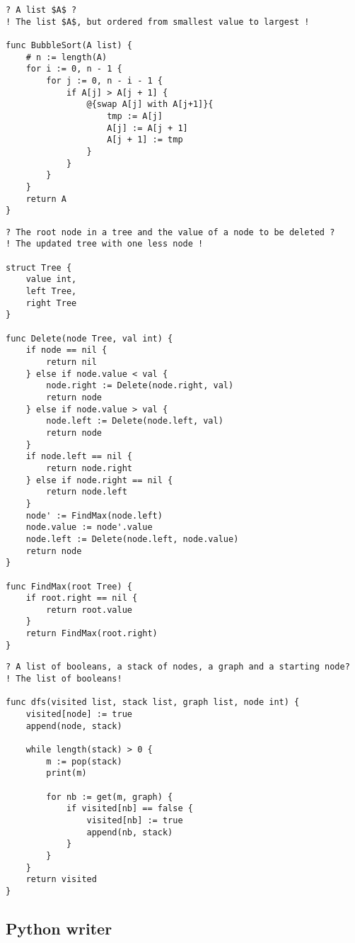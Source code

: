 \begin{lstlisting}[caption={The result of transpiling \Cref{bubbleSortGourmet} back to Gourmet.}, captionpos=b, label={bubbleSortGourmet2}]
? A list $A$ ?
! The list $A$, but ordered from smallest value to largest !

func BubbleSort(A list) {
	# n := length(A)
	for i := 0, n - 1 {
		for j := 0, n - i - 1 {
			if A[j] > A[j + 1] {
				@{swap A[j] with A[j+1]}{
					tmp := A[j]
					A[j] := A[j + 1]
					A[j + 1] := tmp
				}
			}
		}
	}
	return A
}
\end{lstlisting}

\begin{lstlisting}[caption={The result of transpiling \Cref{deleteBSTGourmet} back to Gourmet.}, captionpos=b, label={deleteBSTGourmet2}]
? The root node in a tree and the value of a node to be deleted ?
! The updated tree with one less node !

struct Tree {
	value int,
	left Tree,
	right Tree
}

func Delete(node Tree, val int) {
	if node == nil {
		return nil
	} else if node.value < val {
		node.right := Delete(node.right, val)
		return node
	} else if node.value > val {
		node.left := Delete(node.left, val)
		return node
	}
	if node.left == nil {
		return node.right
	} else if node.right == nil {
		return node.left
	}
	node' := FindMax(node.left)
	node.value := node'.value
	node.left := Delete(node.left, node.value)
	return node
}

func FindMax(root Tree) {
	if root.right == nil {
		return root.value
	}
	return FindMax(root.right)
}
\end{lstlisting}

\begin{lstlisting}[caption={The result of transpiling \Cref{dfsGourmet} back to Gourmet.}, captionpos=b, label={dfsGourmet2}]
? A list of booleans, a stack of nodes, a graph and a starting node?
! The list of booleans!

func dfs(visited list, stack list, graph list, node int) {
    visited[node] := true
    append(node, stack)

    while length(stack) > 0 {
        m := pop(stack)
        print(m)

        for nb := get(m, graph) {
            if visited[nb] == false {
                visited[nb] := true
                append(nb, stack)
            }
        }
    }
    return visited
}
\end{lstlisting}

\subsection{Python writer}

